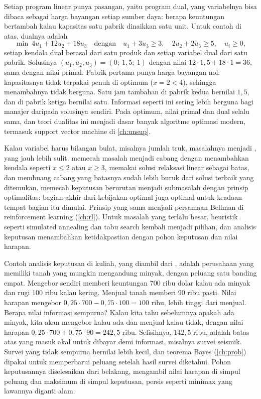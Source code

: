 Setiap program linear punya pasangan, yaitu program dual, yang variabelnya bisa dibaca sebagai
harga bayangan setiap sumber daya: berapa keuntungan bertambah kalau kapasitas satu pabrik
dinaikkan satu unit. Untuk contoh di atas, dualnya adalah
\begin{equation}
\min\ 4u_1+12u_2+18u_3\quad\text{dengan}\quad u_1+3u_3\ge3,\quad 2u_2+2u_3\ge5,\quad u_i\ge0,
\end{equation}
setiap kendala dual berasal dari satu produk dan setiap variabel dual dari satu pabrik. Solusinya
$(u_1,u_2,u_3)=(0;\ 1{,}5;\ 1)$ dengan nilai $12\cdot1{,}5+18\cdot1=36$, sama dengan nilai primal. Pabrik pertama punya
harga bayangan nol: kapasitasnya tidak terpakai penuh di optimum ($x=2<4$), sehingga menambahnya tidak berguna. Satu
jam tambahan di pabrik kedua bernilai $1{,}5$, dan di pabrik ketiga bernilai satu. Informasi seperti ini sering lebih
berguna bagi manajer daripada solusinya sendiri. Pada optimum, nilai primal dan dual selalu sama, dan teori dualitas ini
menjadi dasar banyak algoritme optimasi modern, termasuk support vector machine di \cref{ch:unsup}.

Kalau variabel harus bilangan bulat, misalnya jumlah truk, masalahnya menjadi , yang jauh lebih sulit.  memecah masalah menjadi cabang dengan
menambahkan kendala seperti $x\le2$ atau $x\ge3$, memakai solusi relaksasi linear sebagai batas,
dan membuang cabang yang batasnya sudah lebih buruk dari solusi terbaik yang ditemukan.
 \citep{bellman1957} memecah keputusan berurutan menjadi submasalah
dengan prinsip optimalitas: bagian akhir dari kebijakan optimal juga optimal untuk keadaan tempat
bagian itu dimulai. Prinsip yang sama menjadi persamaan Bellman di reinforcement learning
(\cref{ch:rl}). Untuk masalah yang terlalu besar, heuristik seperti simulated annealing dan tabu
search kembali menjadi pilihan, dan analisis keputusan menambahkan ketidakpastian dengan pohon
keputusan dan nilai harapan.

Contoh analisis keputusan di kuliah, yang diambil dari \citet{hillier2015}, adalah perusahaan yang memiliki tanah yang
mungkin mengandung minyak, dengan peluang satu banding empat. Mengebor sendiri memberi keuntungan 700 ribu dolar kalau ada
minyak dan rugi 100 ribu kalau kering. Menjual tanah memberi 90 ribu pasti. Nilai harapan mengebor
$0{,}25\cdot700-0{,}75\cdot100=100$ ribu, lebih tinggi dari menjual. Berapa nilai informasi sempurna? Kalau kita tahu
sebelumnya apakah ada minyak, kita akan mengebor kalau ada dan menjual kalau tidak, dengan nilai harapan
$0{,}25\cdot700+0{,}75\cdot90=242{,}5$ ribu. Selisihnya, $142{,}5$ ribu, adalah batas atas yang masuk akal untuk dibayar
demi informasi, misalnya survei seismik. Survei yang tidak sempurna bernilai lebih kecil, dan teorema Bayes
(\cref{ch:prob}) dipakai untuk memperbarui peluang setelah hasil survei diketahui. Pohon keputusannya diselesaikan dari
belakang, mengambil nilai harapan di simpul peluang dan maksimum di simpul keputusan, persis seperti minimax yang
lawannya diganti alam.

